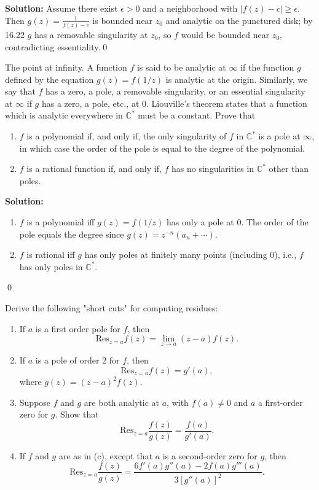 \bigskip\noindent\textbf{Solution:}
Assume there exist $\epsilon>0$ and a neighborhood with $|f(z)-c|\ge\epsilon$. Then $g(z)=\frac{1}{f(z)-c}$ is bounded near $z_0$ and analytic on the punctured disk; by 16.22 $g$ has a removable singularity at $z_0$, so $f$ would be bounded near $z_0$, contradicting essentiality.\qed


\begin{problembox}
The point at infinity. A function \( f \) is said to be analytic at \( \infty \) if the function \( g \) defined by the equation \( g(z) = f(1/z) \) is analytic at the origin. Similarly, we say that \( f \) has a zero, a pole, a removable singularity, or an essential singularity at \( \infty \) if \( g \) has a zero, a pole, etc., at 0. Liouville's theorem states that a function which is analytic everywhere in \( \mathbb{C}^* \) must be a constant. Prove that
\begin{enumerate}[label=(\alph*)]
\item \( f \) is a polynomial if, and only if, the only singularity of \( f \) in \( \mathbb{C}^* \) is a pole at \( \infty \), in which case the order of the pole is equal to the degree of the polynomial.
\item \( f \) is a rational function if, and only if, \( f \) has no singularities in \( \mathbb{C}^* \) other than poles.
\end{enumerate}
\end{problembox}

\bigskip\noindent\textbf{Solution:}
\begin{enumerate}[label=(\alph*)]
\item $f$ is a polynomial iff $g(z)=f(1/z)$ has only a pole at $0$. The order of the pole equals the degree since $g(z)=z^{-n}(a_n+\cdots)$.
\item $f$ is rational iff $g$ has only poles at finitely many points (including $0$), i.e., $f$ has only poles in $\mathbb C^*$.
\end{enumerate}\qed


\begin{problembox}
Derive the following "short cuts" for computing residues:
\begin{enumerate}[label=(\alph*)]
\item If \( a \) is a first order pole for \( f \), then
\[ \text{Res}_{z=a} f(z) = \lim_{z \to a} (z - a) f(z). \]
\item If \( a \) is a pole of order 2 for \( f \), then
\[ \text{Res}_{z=a} f(z) = g'(a), \]
where \( g(z) = (z - a)^2 f(z) \).
\item Suppose \( f \) and \( g \) are both analytic at \( a \), with \( f(a) \neq 0 \) and \( a \) a first-order zero for \( g \). Show that
\[ \text{Res}_{z=a} \frac{f(z)}{g(z)} = \frac{f(a)}{g'(a)}. \]
\item If \( f \) and \( g \) are as in (c), except that \( a \) is a second-order zero for \( g \), then
\[ \text{Res}_{z=a} \frac{f(z)}{g(z)} = \frac{6 f'(a) g''(a) - 2 f(a) g'''(a)}{3 [g''(a)]^2}. \]
\end{enumerate}
\end{problembox}

